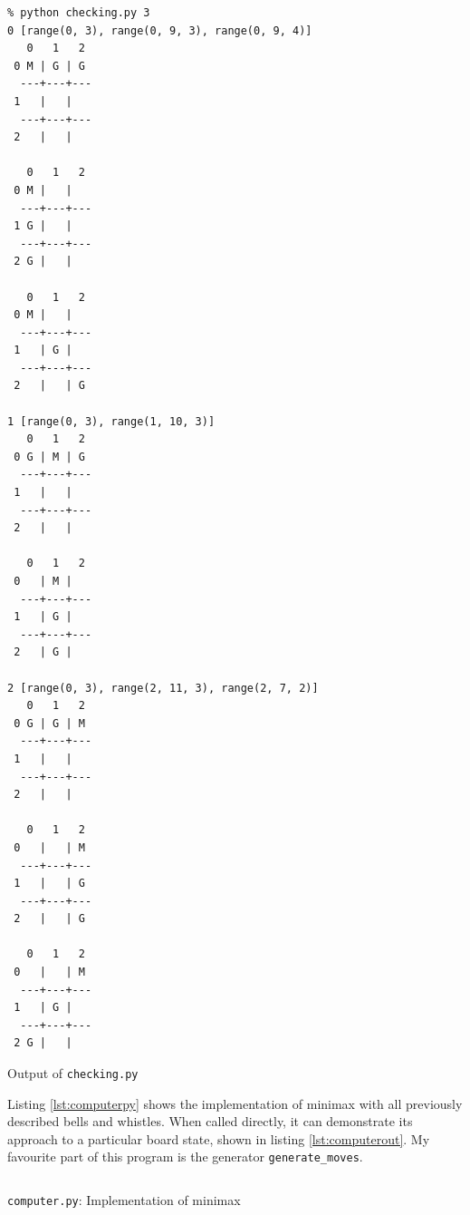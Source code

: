 \documentclass[fleqn,a4paper,11pt]{article}
\begin{document}
\begin{longlisting}
\begin{verbatim}
% python checking.py 3
0 [range(0, 3), range(0, 9, 3), range(0, 9, 4)]
   0   1   2
 0 M | G | G 
  ---+---+---
 1   |   |   
  ---+---+---
 2   |   |   

   0   1   2
 0 M |   |   
  ---+---+---
 1 G |   |   
  ---+---+---
 2 G |   |   

   0   1   2
 0 M |   |   
  ---+---+---
 1   | G |   
  ---+---+---
 2   |   | G 

1 [range(0, 3), range(1, 10, 3)]
   0   1   2
 0 G | M | G 
  ---+---+---
 1   |   |   
  ---+---+---
 2   |   |   

   0   1   2
 0   | M |   
  ---+---+---
 1   | G |   
  ---+---+---
 2   | G |   

2 [range(0, 3), range(2, 11, 3), range(2, 7, 2)]
   0   1   2
 0 G | G | M 
  ---+---+---
 1   |   |   
  ---+---+---
 2   |   |   

   0   1   2
 0   |   | M 
  ---+---+---
 1   |   | G 
  ---+---+---
 2   |   | G 

   0   1   2
 0   |   | M 
  ---+---+---
 1   | G |   
  ---+---+---
 2 G |   |   
\end{verbatim}
\caption{Output of \texttt{checking.py}}\label{lst:checkingout}
\end{longlisting}

    Listing \ref{lst:computerpy} shows the implementation of minimax with all
    previously described bells and whistles. When called directly, it can
    demonstrate its approach to a particular board state, shown in listing
    \ref{lst:computerout}. My favourite part of this program is the generator
    \texttt{generate\_moves}.

\begin{longlisting}
\inputminted{python}{../src/computer.py}
\caption{\texttt{computer.py}: Implementation of minimax}
\label{lst:computerpy}
\end{longlisting}
\end{document}
